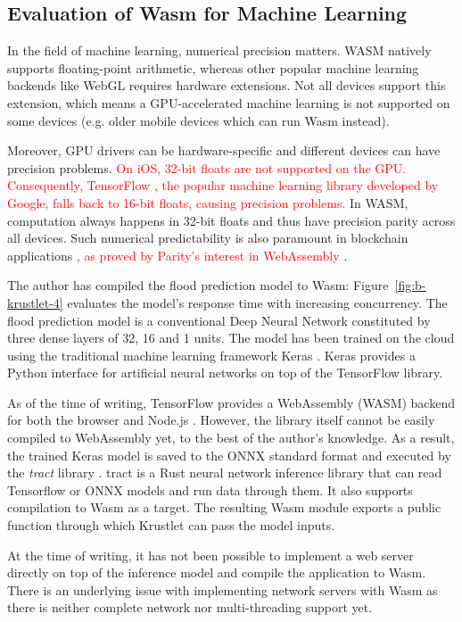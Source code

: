 \subsection{Evaluation of Wasm for Machine Learning}

In the field of machine learning, numerical precision matters. WASM natively supports floating-point arithmetic, whereas other popular machine learning backends like WebGL requires hardware extensions. Not all devices support this extension, which means a GPU-accelerated machine learning is not supported on some devices (e.g. older mobile devices which can run Wasm instead).

Moreover, GPU drivers can be hardware-specific and different devices can have precision problems. \textcolor{red}{On iOS, 32-bit floats are not supported on the GPU. Consequently, TensorFlow \cite{tensorflow}, the popular machine learning library developed by Google, falls back to 16-bit floats, causing precision problems.} In WASM, computation always happens in 32-bit floats and thus have precision parity across all devices. Such numerical predictability is also paramount in blockchain applications \textcolor{red}{, as proved by Parity's interest in WebAssembly} \cite{parity-wasm}.

The author has compiled the flood prediction model to Wasm: Figure~\ref{fig:b-krustlet-4} evaluates the model's response time with increasing concurrency. The flood prediction model is a conventional Deep Neural Network constituted by three dense layers of 32, 16 and 1 units. The model has been trained on the cloud using the traditional machine learning framework Keras \cite{keras}. Keras provides a Python interface for artificial neural networks on top of the TensorFlow library.

As of the time of writing, TensorFlow provides a WebAssembly (WASM) backend for both the browser and Node.js \cite{tf-wasm}. However, the library itself cannot be easily compiled to WebAssembly yet, to the best of the author's knowledge. As a result, the trained Keras model is saved to the ONNX \cite{onnx} standard format and executed by the \emph{tract} library \cite{tract}. tract is a Rust neural network inference library that can read Tensorflow or ONNX models and run data through them. It also supports compilation to Wasm as a target. The resulting Wasm module exports a public function through which Krustlet can pass the model inputs. 

At the time of writing, it has not been possible to implement a web server directly on top of the inference model and compile the application to Wasm. There is an underlying issue with implementing network servers with Wasm as there is neither complete network nor multi-threading support yet.

